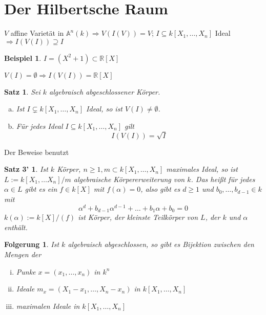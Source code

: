 \documentclass[a4paper, 12pt, numbers=noendperiod, chapterprefix=true, headsepline]{scrbook}
\theoremstyle{break}
\newtheorem{Satz}{Satz}
\newtheorem{Folg}[Def]{Folgerung}
\theoremstyle{nonumberbreak}
\newtheorem{nnBsp}{Beispiel}
\newtheorem{nnSatz3}{Satz 3'} %
\theoremstyle{nonumberplain}
\newcommand{\R}{\mathbb{R}}
\newcommand{\A}{\mathbb{A}}
\begin{document}

\section{Der Hilbertsche Raum}

$V$ affine Variet\"at in $ \A ^n(k) \Rightarrow V(I(V))=V$; $I\subseteq k[X_1,\dots ,X_n]$ Ideal $\Rightarrow I(V(I))\supseteq I$

\begin{nnBsp}
$I=(X^2+1)\subset\R[X]$

$V(I)=\emptyset \Rightarrow I(V(I)) = \R[X]$
\end{nnBsp}

\begin{Satz}\label{satz3}
Sei $k$ algebraisch abgeschlossener K\"orper.\begin{enumerate}[a)]
\item\label{satz3a}
	Ist $I\subsetneq k[X_1,\dots ,X_n]$ Ideal, so ist $V(I)\not=\emptyset$.
\item
	F\"ur jedes Ideal $I\subseteq k[X_1,\dots ,X_n]$ gilt
		\[I(V(I)) = \sqrt I\]
\end{enumerate}\end{Satz}

Der Beweise benutzt

\begin{nnSatz3}\label{hilfsatz3}
Ist $k$ K\"orper, $n\ge1, m\subset k[X_1,\dots ,X_n]$ maximales Ideal, so ist $L:=k[X_1,\dots X_n]/m$ \emph{algebraische} K\"orpererweiterung von $k$. Das hei\ss t f\"ur jedes $\alpha\in L$ gibt es ein $f\in k[X]$ mit $f(\alpha)=0$, also gibt es $d\ge1$ und $b_0,\dots ,b_{d-1}\in k$ mit
	\[\alpha^d+b_{d-1}\alpha^{d-1}+\dots +b_1\alpha + b_0=0\]
$k(\alpha):=k[X]/(f)$ ist K\"orper, der kleinste Teilk\"orper von $L$, der $k$ und $\alpha$ enth\"alt.
\end{nnSatz3}

\begin{Folg}\label{folg5.1}
Ist $k$ algebraisch abgeschlossen, so gibt es Bijektion zwischen den Mengen der\begin{enumerate}[i)]
\item
	Punke $x=(x_1,\dots ,x_n)$ in $k^n$
\item
	Ideale $m_x=(X_1-x_1,\dots ,X_n-x_n)$ in $k[X_1,\dots ,X_n]$
\item
	maximalen Ideale in $k[X_1,\dots ,X_n]$
\end{enumerate}\end{Folg}
\end{document}
